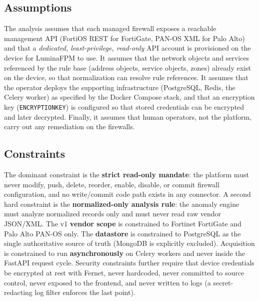 \documentclass[12pt,a4paper]{report}
\renewcommand{\_}{\textunderscore\allowbreak}
\begin{document}
\subsection{Assumptions}
\label{sec:ch3-assumptions}
The analysis assumes that each managed firewall exposes a reachable management API (FortiOS REST for FortiGate, PAN-OS XML for Palo Alto) and that a \emph{dedicated, least-privilege, read-only} API account is provisioned on the device for LuminaFPM to use. It assumes that the network objects and services referenced by the rule base (address objects, service objects, zones) already exist on the device, so that normalization can resolve rule references. It assumes that the operator deploys the supporting infrastructure (PostgreSQL, Redis, the Celery worker) as specified by the Docker Compose stack, and that an encryption key (\texttt{ENCRYPTION\_KEY}) is configured so that stored credentials can be encrypted and later decrypted. Finally, it assumes that human operators, not the platform, carry out any remediation on the firewalls.

\subsection{Constraints}
\label{sec:ch3-constraints}
The dominant constraint is the \textbf{strict read-only mandate}: the platform must never modify, push, delete, reorder, enable, disable, or commit firewall configuration, and no write/commit code path exists in any connector. A second hard constraint is the \textbf{normalized-only analysis rule}: the anomaly engine must analyze normalized records only and must never read raw vendor JSON/XML. The v1 \textbf{vendor scope} is constrained to Fortinet FortiGate and Palo Alto PAN-OS only. The \textbf{datastore} is constrained to PostgreSQL as the single authoritative source of truth (MongoDB is explicitly excluded). Acquisition is constrained to run \textbf{asynchronously} on Celery workers and never inside the FastAPI request cycle. Security constraints further require that device credentials be encrypted at rest with Fernet, never hardcoded, never committed to source control, never exposed to the frontend, and never written to logs (a secret-redacting log filter enforces the last point).
\end{document}
